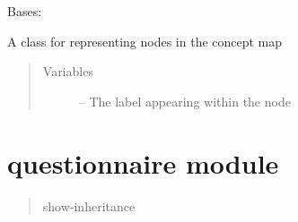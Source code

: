 \documentclass[letterpaper,10pt,english]{sphinxmanual}
\begin{document}
\begin{fulllineitems}
\label{\detokenize{node:node.Node}}
Bases: 

A class for representing nodes in the concept map
\begin{quote}\begin{description}
\item[{Variables}] \leavevmode
{} -- The label appearing within the node

\end{description}\end{quote}

\end{fulllineitems}



\chapter{questionnaire module}
\label{\detokenize{questionnaire:questionnaire-module}}\label{\detokenize{questionnaire::doc}}\label{\detokenize{questionnaire:module-questionnaire}}\begin{quote}\begin{description}
\item[{show-inheritance}] \leavevmode
\end{description}\end{quote}
\end{document}
